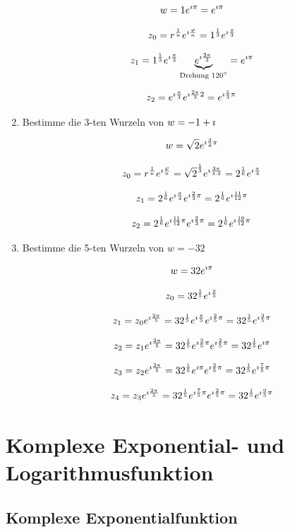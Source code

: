 \begin{enumerate}
	$$w= 1e^{\imath\pi}=e^{\imath\pi}$$
	
	$$z_0=r^\frac{1}{n}e^{\imath\frac{\varphi}{n}}=1^\frac{1}{3}e^{\imath\frac{\pi}{3}}$$
	
	$$z_1=1^\frac{1}{3}e^{\imath\frac{\pi}{3}}\underbrace{e^{\imath\frac{2\pi}{3}}}_\text{Drehung 120${^\circ}$}=e^{\imath\pi}$$

	$$z_2=e^{\imath\frac{\pi}{3}}e^{\imath\frac{2\pi}{3}2}=e^{\imath\frac{5}{3}\pi}$$
	
	
	\item Bestimme die 3-ten Wurzeln von $w=-1+\imath$
	
	$$w=\sqrt 2 e^{\imath\frac{3}{4}\pi}$$
	
	$$z_0=r^\frac{1}{n}e^{\imath\frac{\varphi}{n}}=\sqrt{2}^\frac{1}{3}e^{\imath\frac{3\pi}{4\cdot3}}=2^\frac{1}{6}e^{\imath\frac{\pi}{4}}$$
	
	$$z_1=2^\frac{1}{6}e^{\imath\frac{\pi}{4}}e^{\imath\frac{2}{3}\pi}=2^\frac{1}{6}e^{\imath\frac{11}{12}\pi}$$
	
	$$z_2=2^\frac{1}{6}e^{\imath\frac{11}{12}\pi}e^{\imath\frac{2}{3}\pi}=2^\frac{1}{6}e^{\imath\frac{19}{12}\pi}$$
	
	
	\item Bestimme die 5-ten Wurzeln von $w=-32$
	
	$$w= 32e^{\imath\pi}$$
	
	$$z_0 = 32^\frac{1}{5}e^{\imath\frac{\pi}{5}}$$
	
	$$z_1 = z_0e^{\imath\frac{2\pi}{5}} = 32^\frac{1}{5}e^{\imath\frac{\pi}{5}}e^{\imath\frac{2}{5}\pi} = 32^\frac{1}{5}e^{\imath\frac{3}{5}\pi}$$
	
	$$z_2 = z_1e^{\imath\frac{2\pi}{5}} = 32^\frac{1}{5}e^{\imath\frac{3}{5}\pi}e^{\imath\frac{2}{5}\pi} = 32^\frac{1}{5}e^{\imath\pi}$$
	
	$$z_3 = z_2e^{\imath\frac{2\pi}{5}} = 32^\frac{1}{5}e^{\imath\pi}e^{\imath\frac{2}{5}\pi} = 32^\frac{1}{5}e^{\imath\frac{7}{5}\pi}$$
	
	$$z_4 = z_3e^{\imath\frac{2\pi}{5}} = 32^\frac{1}{5}e^{\imath\frac{7}{5}\pi}e^{\imath\frac{2}{5}\pi} = 32^\frac{1}{5}e^{\imath\frac{9}{5}\pi}$$
	
	
\end{enumerate}



\clearpage
\section{Komplexe Exponential- und Logarithmusfunktion}
\subsection{Komplexe Exponentialfunktion}

